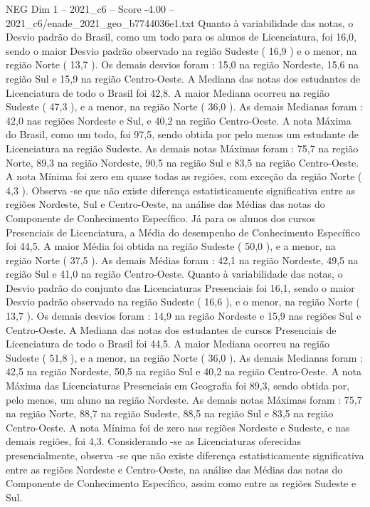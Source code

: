 \begin{textsample}{NEG Dim 1 – 2021\_c6 – Score -4.00 – 2021\_c6/enade\_2021\_geo\_b7744036e1.txt}
Quanto à variabilidade das notas, o Desvio padrão do Brasil, como um todo para os alunos de Licenciatura, foi 16,0, sendo o maior Desvio padrão observado na região Sudeste ( 16,9 ) e o menor, na região Norte ( 13,7 ).
Os demais desvios foram : 15,0 na região Nordeste, 15,6 na região Sul e 15,9 na região Centro-Oeste.
A Mediana das notas dos estudantes de Licenciatura de todo o Brasil foi 42,8.
A maior Mediana ocorreu na região Sudeste ( 47,3 ), e a menor, na região Norte ( 36,0 ).
As demais Medianas foram : 42,0 nas regiões Nordeste e Sul, e 40,2 na região Centro-Oeste.
A nota Máxima do Brasil, como um todo, foi 97,5, sendo obtida por pelo menos um estudante de Licenciatura na região Sudeste.
As demais notas Máximas foram : 75,7 na região Norte, 89,3 na região Nordeste, 90,5 na região Sul e 83,5 na região Centro-Oeste.
A nota Mínima foi zero em quase todas as regiões, com exceção da região Norte ( 4,3 ).
Observa -se que não existe diferença estatisticamente significativa entre as regiões Nordeste, Sul e Centro-Oeste, na análise das Médias das notas do Componente de Conhecimento Específico.
Já para os alunos dos cursos Presenciais de Licenciatura, a Média do desempenho de Conhecimento Específico foi 44,5.
A maior Média foi obtida na região Sudeste ( 50,0 ), e a menor, na região Norte ( 37,5 ).
As demais Médias foram : 42,1 na região Nordeste, 49,5 na região Sul e 41,0 na região Centro-Oeste.
Quanto à variabilidade das notas, o Desvio padrão do conjunto das Licenciaturas Presenciais foi 16,1, sendo o maior Desvio padrão observado na região Sudeste ( 16,6 ), e o menor, na região Norte ( 13,7 ).
Os demais desvios foram : 14,9 na região Nordeste e 15,9 nas regiões Sul e Centro-Oeste.
A Mediana das notas dos estudantes de cursos Presenciais de Licenciatura de todo o Brasil foi 44,5.
A maior Mediana ocorreu na região Sudeste ( 51,8 ), e a menor, na região Norte ( 36,0 ).
As demais Medianas foram : 42,5 na região Nordeste, 50,5 na região Sul e 40,2 na região Centro-Oeste.
A nota Máxima das Licenciaturas Presenciais em Geografia foi 89,3, sendo obtida por, pelo menos, um aluno na região Nordeste.
As demais notas Máximas foram : 75,7 na região Norte, 88,7 na região Sudeste, 88,5 na região Sul e 83,5 na região Centro-Oeste.
A nota Mínima foi de zero nas regiões Nordeste e Sudeste, e nas demais regiões, foi 4,3.
Considerando -se as Licenciaturas oferecidas presencialmente, observa -se que não existe diferença estatisticamente significativa entre as regiões Nordeste e Centro-Oeste, na análise das Médias das notas do Componente de Conhecimento Específico, assim como entre as regiões Sudeste e Sul.

\end{textsample}

